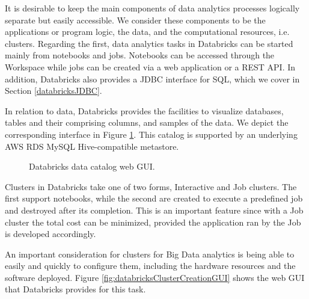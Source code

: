 It is desirable to keep the main components of data analytics processes logically separate but easily accessible. We consider these components to be the applications or program logic, the data, and the computational resources, i.e. clusters. Regarding the first, data analytics tasks in Databricks can be started mainly from notebooks and jobs. Notebooks can be accessed through the Workspace while jobs can be created via a web application or a REST API. In addition, Databricks also provides a JDBC interface for SQL, which we cover in Section \ref{databricksJDBC}.

In relation to data, Databricks provides the facilities to visualize databases, tables and their comprising columns, and samples of the data. We depict the corresponding interface in Figure \ref{fig:databricksDataCatalogGUI}. This catalog is supported by an underlying AWS RDS MySQL Hive-compatible metastore.

\begin{figure}
   \begin{center}
   \end{center}
   \caption{Databricks data catalog web GUI.}
   \label{fig:databricksDataCatalogGUI}
\end{figure}

Clusters in Databricks take one of two forms, Interactive and Job clusters. The first support notebooks, while the second are created to execute a predefined job and destroyed after its completion. This is an important feature since with a Job cluster the total cost can be minimized, provided the application ran by the Job is developed accordingly.

An important consideration for clusters for Big Data analytics is being able to easily and quickly to configure them, including the hardware resources and the software deployed. Figure \ref{fig:databricksClusterCreationGUI} shows the web GUI that Databricks provides for this task.

